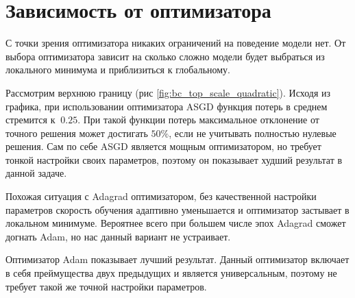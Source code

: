\section{Зависимость от оптимизатора}

С точки зрения оптимизатора никаких ограничений на поведение
модели нет. От выбора оптимизатора зависит на сколько сложно
модели будет выбраться из локального минимума и приблизиться
к глобальному.

Рассмотрим верхнюю границу (рис \ref{fig:bc_top_scale_quadratic}).
Исходя из графика, при использовании оптимизатора ASGD
функция потерь в среднем стремится к $~0.25$. При такой 
функции потерь максимальное отклонение от точного решения
может достигать $50\%$, если не учитывать полностью
нулевые решения. Сам по себе ASGD является мощным оптимизатором,
но требует тонкой настройки своих параметров, поэтому он
показывает худший результат в данной задаче.

Похожая ситуация с Adagrad оптимизатором, без качественной
настройки параметров скорость обучения адаптивно уменьшается
и оптимизатор застывает в локальном минимуме. Вероятнее всего
при большем числе эпох Adagrad сможет догнать Adam, но нас
данный вариант не устраивает.

Оптимизатор Adam показывает лучший результат. Данный оптимизатор
включает в себя преймущества двух предыдущих и является универсальным,
поэтому не требует такой же точной настройки параметров.

